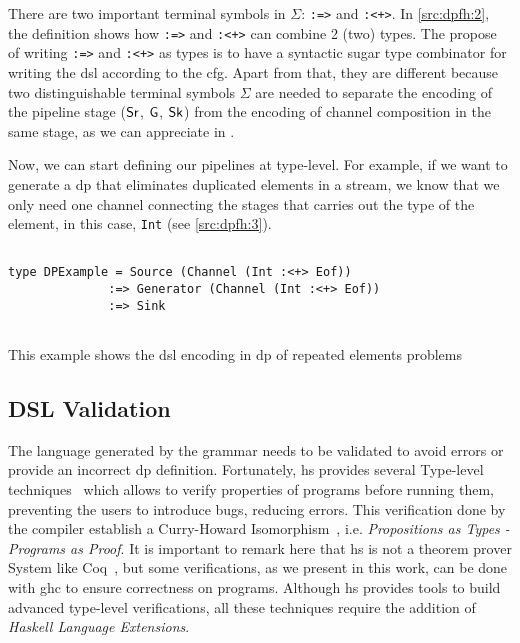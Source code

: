 There are two important terminal symbols in $\Sigma$: \texttt{:=>} and \texttt{:<+>}.
In \autoref{src:dpfh:2}, the definition shows how \texttt{:=>} and \texttt{:<+>} can combine 2 (two) types. 
The propose of writing \texttt{:=>} and \texttt{:<+>} as types is to have a syntactic sugar type combinator for writing the \acrshort{dsl} according to the \acrshort{cfg}. 
Apart from that, they are different because two distinguishable terminal symbols $\Sigma$ are needed to separate the encoding of the pipeline stage ($\mathsf{Sr}$, $\mathsf{G}$, $\mathsf{Sk}$)
from the encoding of channel composition in the same stage, as we can appreciate in .

Now, we can start defining our pipelines at type-level. For example, if we want to generate a \acrshort{dp} that eliminates duplicated elements in a stream, we know that we only need one channel connecting the stages that carries out the type of the element, in this case, \texttt{Int} (see \autoref{src:dpfh:3}).

\begin{listing}[H]
  \begin{verbatim}

type DPExample = Source (Channel (Int :<+> Eof)) 
              :=> Generator (Channel (Int :<+> Eof)) 
              :=> Sink
   
  \end{verbatim}
  \caption[{[\texttt{Repeated.hs} Example of \acrshort{dp} encoded in $G_{dsl}$}]{This example shows the \acrshort{dsl} encoding in \acrshort{dp} of repeated elements problems}
  \label{src:dpfh:3}
\end{listing}

\subsection{DSL Validation}\label{sub:sec:dsl-val}
The language generated by the grammar needs to be validated to avoid errors or provide an incorrect \acrshort{dp} definition.
Fortunately, \acrshort{hs} provides several Type-level techniques~\cite{type-haskell} which allows to verify properties of programs before running them, 
preventing the users to introduce bugs, reducing errors. This verification done by the compiler establish a Curry-Howard Isomorphism~\cite{curryhoward}, i.e. 
\emph{Propositions as Types - Programs as Proof}. It is important to remark here that \acrshort{hs} is not a theorem prover System like Coq~\cite{coq}, but some verifications, as we present in this work, can be done with \acrshort{ghc} to ensure correctness on programs.
Although \acrshort{hs} provides tools to build advanced type-level verifications, all these techniques require the addition of \emph{Haskell Language Extensions}.

